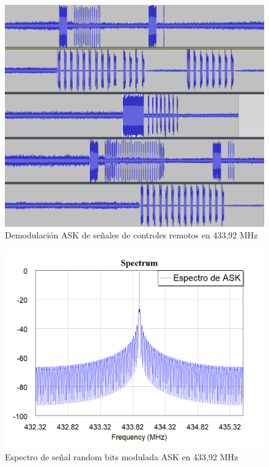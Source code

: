\begin{figure}[htb]
	\centering
	\includegraphics[scale=0.4]{images/llaves.png}
	\caption{Demodulación ASK de señales de controles remotos en 433,92 MHz}
	\label{llaves}
\end{figure}

\begin{figure}[htb]
	\centering
	\includegraphics[scale=0.4]{images/espectro_ASK.png}
	\caption{Espectro de señal random bits modulada ASK en 433,92 MHz }
	\label{espectro_ASK}
\end{figure}

